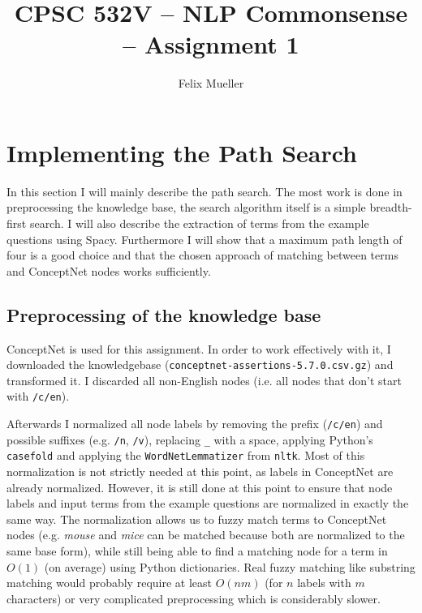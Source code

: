 \documentclass{article}
\begin{document}

\title{CPSC 532V -- NLP Commonsense -- Assignment 1}
\author{Felix Mueller}
\date{}
\maketitle

\section{Implementing the Path Search}
\label{sec:step-1:-implement}

In this section I will mainly describe the path search. The most work
is done in preprocessing the knowledge base, the search algorithm
itself is a simple breadth-first search.  I will also describe the
extraction of terms from the example questions using
Spacy. Furthermore I will show that a maximum path length of four is
a good choice and that the chosen approach of matching between terms
and ConceptNet nodes works sufficiently.

\subsection*{Preprocessing of the knowledge base}
\label{sec:prepr-knowl-base}

ConceptNet is used for this assignment. In order to work effectively
with it, I downloaded the knowledgebase
(\verb`conceptnet-assertions-5.7.0.csv.gz`) and transformed it. I
discarded all non-English nodes (i.e. all nodes that don't start with
\verb`/c/en`).

Afterwards I normalized all node labels by removing the prefix
(\verb`/c/en`) and possible suffixes (e.g.  \verb`/n`, \verb`/v`),
replacing \verb`_` with a space, applying Python's \verb|casefold| and
applying the \verb`WordNetLemmatizer` from \verb`nltk`. Most of this
normalization is not strictly needed at this point, as labels in
ConceptNet are already normalized. However, it is still done at this
point to ensure that node labels and input terms from the example
questions are normalized in exactly the same way. The normalization
allows us to fuzzy match terms to ConceptNet nodes (e.g. \emph{mouse}
and \emph{mice} can be matched because both are normalized to the same
base form), while still being able to find a matching node for a term
in $O(1)$ (on average) using Python dictionaries. Real fuzzy matching
like substring matching would probably require at least $O(nm)$ (for
$n$ labels with $m$ characters) or very complicated preprocessing
which is considerably slower.
\end{document}
